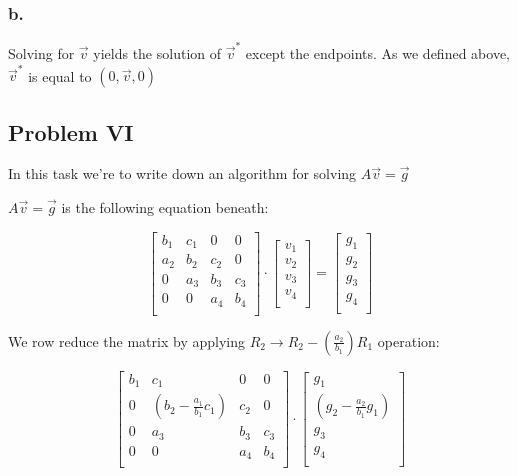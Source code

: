 \documentclass{article}
\begin{document}
\subsubsection*{b.}

Solving for $\Vec{v}$ yields the solution of $\Vec{v}^*$ except the endpoints. As we defined above, $\Vec{v}^*$ is equal to $(0,\Vec{v},0)$

\subsection*{Problem VI}\label{Problem 6}
In this task we're to write down an algorithm for solving $A\Vec{v} = \Vec{g}$
\vskip 0.1in
\begin{flushleft}
$A\Vec{v} = \Vec{g}$ is the following equation beneath:
\end{flushleft}
\begin{equation*}
\begin{bmatrix}
    b_1 & c_1 & 0 & 0     \\ 
    a_2 & b_2 & c_2 & 0    \\ 
    0 & a_3 & b_3 & c_3    \\ 
    0 & 0 & a_4 & b_4     \\ 
\end{bmatrix}
\cdot
\begin{bmatrix}
    v_1 \\
    v_2 \\
    v_3 \\
    v_4 \\
\end{bmatrix}
= 
\begin{bmatrix}
    g_1 \\
    g_2 \\
    g_3 \\
    g_4 \\
\end{bmatrix}
\end{equation*}

We row reduce the matrix by applying $R_2 \rightarrow R_2 - (\frac{a_2}{b_1})R_1$ operation:

\begin{equation*}
    \begin{bmatrix}
        b_1 & c_1 & 0 & 0                       \\
        0 & (b_2-\frac{a_1}{b_1}c_1) & c_2 & 0  \\
        0 & a_3 & b_3 & c_3                     \\
        0 & 0 & a_4 & b_4                       \\
    \end{bmatrix}
    \cdot
    \begin{bmatrix}
        g_1                                     \\
        (g_2-\frac{a_2}{b_1}g_1)                \\
        g_3                                     \\
        g_4                                     \\
    \end{bmatrix}
\end{equation*}
\end{document}
